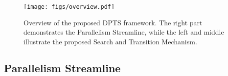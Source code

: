     


\begin{figure*}
    \centering
    \texttt{[image: figs/overview.pdf]}
    \vspace{-0.35in}
    \caption{Overview of the proposed DPTS framework. The right part demonstrates the Parallelism Streamline, while the left and middle illustrate the proposed Search and Transition Mechanism. }
    \label{fig:overview}
    \vspace{-0.1in}
\end{figure*}

\subsection{Parallelism Streamline}
\label{sec:method_parallel}


